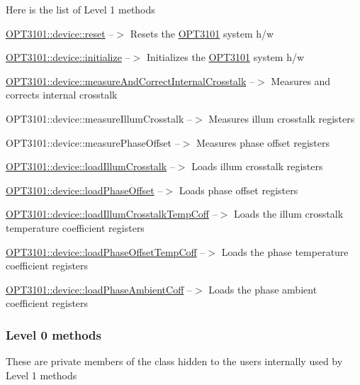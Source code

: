 Here is the list of Level 1 methods
\begin{DoxyEnumerate}
\item \mbox{\hyperlink{class_o_p_t3101_1_1device_a1d37b22f535d8130c7f24799f7fa3c33}{O\+P\+T3101\+::device\+::reset}} --$>$ Resets the \mbox{\hyperlink{namespace_o_p_t3101}{O\+P\+T3101}} system h/w
\item \mbox{\hyperlink{class_o_p_t3101_1_1device_ae3b7fb4f9a8f1dee330523e034aa9460}{O\+P\+T3101\+::device\+::initialize}} --$>$ Initializes the \mbox{\hyperlink{namespace_o_p_t3101}{O\+P\+T3101}} system h/w
\item \mbox{\hyperlink{class_o_p_t3101_1_1device_a44f832d6edbfb26db079ddba4debfdba}{O\+P\+T3101\+::device\+::measure\+And\+Correct\+Internal\+Crosstalk}} --$>$ Measures and corrects internal crosstalk
\item O\+P\+T3101\+::device\+::measure\+Illum\+Crosstalk --$>$ Measures illum crosstalk registers
\item O\+P\+T3101\+::device\+::measure\+Phase\+Offset --$>$ Measures phase offset registers
\item \mbox{\hyperlink{class_o_p_t3101_1_1device_acb915ffb10d3c725fe4a58f22d69d27d}{O\+P\+T3101\+::device\+::load\+Illum\+Crosstalk}} --$>$ Loads illum crosstalk registers
\item \mbox{\hyperlink{class_o_p_t3101_1_1device_a941591aefa8b4c9b7436ac8f216938ed}{O\+P\+T3101\+::device\+::load\+Phase\+Offset}} --$>$ Loads phase offset registers
\item \mbox{\hyperlink{class_o_p_t3101_1_1device_a450bc6b5bcd3e6b232d4352229a2829c}{O\+P\+T3101\+::device\+::load\+Illum\+Crosstalk\+Temp\+Coff}} --$>$ Loads the illum crosstalk temperature coefficient registers
\item \mbox{\hyperlink{class_o_p_t3101_1_1device_a71e7ec6f26d54ea7cba11bf1c4132489}{O\+P\+T3101\+::device\+::load\+Phase\+Offset\+Temp\+Coff}} --$>$ Loads the phase temperature coefficient registers
\item \mbox{\hyperlink{class_o_p_t3101_1_1device_aa34206319a66be86de29789a1c24e3f7}{O\+P\+T3101\+::device\+::load\+Phase\+Ambient\+Coff}} --$>$ Loads the phase ambient coefficient registers
\end{DoxyEnumerate}

\subsubsection*{Level 0 methods}

These are private members of the class hidden to the users internally used by Level 1 methods 



